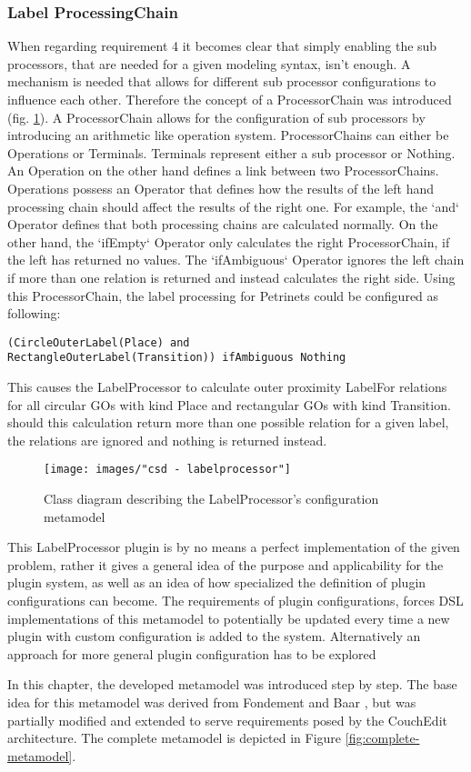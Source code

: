 \subsubsection{Label ProcessingChain}
When regarding requirement 4 it becomes clear that simply enabling the sub processors, that are needed for a given modeling syntax, isn't enough. A mechanism is needed that allows for different sub processor configurations to influence each other. Therefore the concept of a ProcessorChain was introduced (fig. \ref{fig:labelprocessor-config}). A ProcessorChain allows for the configuration of sub processors by introducing an arithmetic like operation system. ProcessorChains can either be Operations or Terminals. Terminals represent either a sub processor or Nothing. An Operation on the other hand defines a link between two ProcessorChains. Operations possess an Operator that defines how the results of the left hand processing chain should affect the results of the right one. For example, the `and` Operator defines that both processing chains are calculated normally. On the other hand, the `ifEmpty` Operator only calculates the right ProcessorChain, if the left has returned no values. The `ifAmbiguous` Operator ignores the left chain if more than one relation is returned and instead calculates the right side. Using this ProcessorChain, the label processing for Petrinets could be configured as following: 
\begin{lstlisting}
(CircleOuterLabel(Place) and 
RectangleOuterLabel(Transition)) ifAmbiguous Nothing
\end{lstlisting}
This causes the LabelProcessor to calculate outer proximity LabelFor relations for all circular GOs with kind Place and rectangular GOs with kind Transition. should this calculation return more than one possible relation for a given label, the relations are ignored and nothing is returned instead.

\begin{figure}[ht]
\centering
\texttt{[image: images/"csd - labelprocessor"]}
\caption{Class diagram describing the LabelProcessor's configuration metamodel}
\label{fig:labelprocessor-config}
\end{figure}

This LabelProcessor plugin is by no means a perfect implementation of the given problem, rather it gives a general idea of the purpose and applicability for the plugin system, as well as an idea of how specialized the definition of plugin configurations can become. The requirements of plugin configurations, forces DSL implementations of this metamodel to potentially be updated every time a new plugin with custom configuration is added to the system. Alternatively an approach for more general plugin configuration has to be explored


In this chapter, the developed metamodel was introduced step by step. The base idea for this metamodel was derived from Fondement and Baar \cite{fondement_making_2005}, but was partially modified and extended to serve requirements posed by the CouchEdit architecture. The complete metamodel is depicted in Figure \ref{fig:complete-metamodel}. 